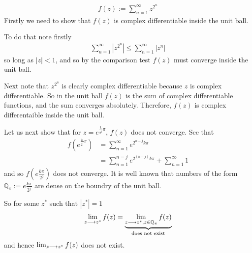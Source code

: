 \documentclass{unswmaths}
\begin{document}
\section{}
\begin{align*}
    f(z) := \sum_{n=1}^\infty z^{2^n}
\end{align*}
Firstly we need to show that $ f(z) $ is complex differentiable inside the unit ball.

To do that note firstly
\begin{align*}
    \sum_{n=1}^\infty \left| z^{2^n} \right| \leq \sum_{n=1}^\infty |z^n| 
\end{align*}
so long as $ |z| < 1 $, and so by the comparison test $ f(z) $ must converge inside the unit ball.

Next note that $ z^{2^n} $ is clearly complex differentiable because $ z $ is complex differentiable. 
So in the unit ball $ f(z) $ is the sum of complex differentiable functions, and the sum converges absolutely. Therefore, $ f(z) $ is complex differentaible inside the unit ball.

Let us next show that for $ z = e^{\frac{k}{2^j} \pi} $, $f(z) $ does not converge. 
See that
\begin{align*}
    f(e^{\frac{k}{2^j}\pi}) &= \sum_{n=1}^\infty e^{2^{n-j} k\pi} \\
        &= \sum_{n=1}^{n=j} e^{2^(n-j)k\pi} + \sum_{n=1}^\infty 1
\end{align*}
and so $ f(e\frac{k\pi}{2^j}) $ does not converge. It is well known that numbers of the form $ \mathbb{Q}_{\pi} := e\frac{k\pi}{2^j} $ are dense on the boundry of the unit ball. 

So for some $ z^* $ such that $ |z^*| = 1 $
\begin{align*}
    \lim_{z\longrightarrow z^*} f(z) = \underbrace{\lim_{z \longrightarrow z^*, z \in \mathbb{Q}_{\pi}} f(z)}_{\text{does not exist}}
\end{align*}
and hence $ \lim_{z \longrightarrow z^*}f(z) $ does not exist. 
\end{document}
